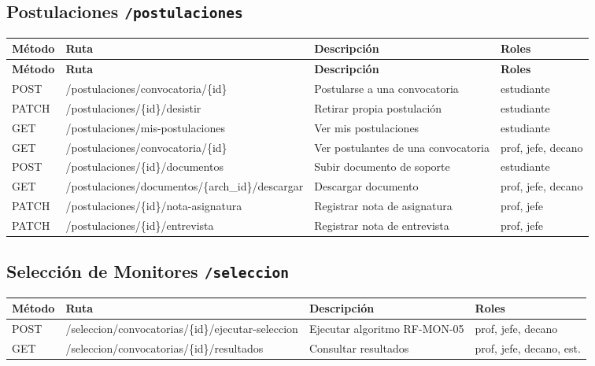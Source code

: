\documentclass[12pt,a4paper]{article}
\begin{document}
\subsection{Postulaciones \texttt{/postulaciones}}
\begin{longtable}{>{\ttfamily}p{1.5cm} >{\ttfamily}p{6cm} p{4.5cm} p{2cm}}
  \toprule
  \textbf{Método} & \textbf{Ruta} & \textbf{Descripción} & \textbf{Roles} \\
  \midrule
  \endfirsthead
  \toprule \textbf{Método} & \textbf{Ruta} & \textbf{Descripción} & \textbf{Roles} \\ \midrule
  \endhead
  POST   & /postulaciones/convocatoria/\{id\} & Postularse a una convocatoria & estudiante \\
  PATCH  & /postulaciones/\{id\}/desistir & Retirar propia postulación & estudiante \\
  GET    & /postulaciones/mis-postulaciones & Ver mis postulaciones & estudiante \\
  GET    & /postulaciones/convocatoria/\{id\} & Ver postulantes de una convocatoria & prof, jefe, decano \\
  POST   & /postulaciones/\{id\}/documentos & Subir documento de soporte & estudiante \\
  GET    & /postulaciones/documentos/\{arch\_id\}/descargar & Descargar documento & prof, jefe, decano \\
  PATCH  & /postulaciones/\{id\}/nota-asignatura & Registrar nota de asignatura & prof, jefe \\
  PATCH  & /postulaciones/\{id\}/entrevista & Registrar nota de entrevista & prof, jefe \\
  \bottomrule
\end{longtable}

\subsection{Selección de Monitores \texttt{/seleccion}}
\begin{longtable}{>{\ttfamily}p{1.5cm} >{\ttfamily}p{6.5cm} p{4cm} p{2cm}}
  \toprule
  \textbf{Método} & \textbf{Ruta} & \textbf{Descripción} & \textbf{Roles} \\
  \midrule
  POST   & /seleccion/convocatorias/\{id\}/ejecutar-seleccion & Ejecutar algoritmo RF-MON-05 & prof, jefe, decano \\
  GET    & /seleccion/convocatorias/\{id\}/resultados & Consultar resultados & prof, jefe, decano, est. \\
  \bottomrule
\end{longtable}
\end{document}
